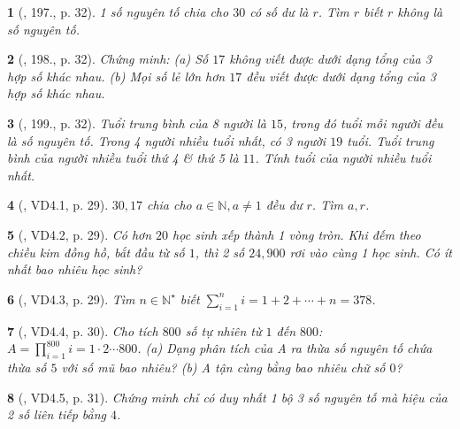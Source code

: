 \documentclass{article}
\newtheorem{baitoan}{}
\begin{document}
\begin{baitoan}[\cite{Binh_Toan_6_tap_1}, 197., p. 32]
	1 số nguyên tố chia cho $30$ có số dư là $r$. Tìm $r$ biết $r$ không là số nguyên tố.
\end{baitoan}

\begin{baitoan}[\cite{Binh_Toan_6_tap_1}, 198., p. 32]
	Chứng minh: (a) Số $17$ không viết được dưới dạng tổng của 3 hợp số khác nhau. (b) Mọi số lẻ lớn hơn $17$ đều viết được dưới dạng tổng của 3 hợp số khác nhau.
\end{baitoan}

\begin{baitoan}[\cite{Binh_Toan_6_tap_1}, 199., p. 32]
	Tuổi trung bình của 8 người là $15$, trong đó tuổi mỗi người đều là số nguyên tố. Trong 4 người nhiều tuổi nhất, có 3 người $19$ tuổi. Tuổi trung bình của người nhiều tuổi thứ 4 \& thứ 5 là $11$. Tính tuổi của người nhiều tuổi nhất.
\end{baitoan}

\begin{baitoan}[\cite{TLCT_THCS_Toan_6_so_hoc}, VD4.1, p. 29]
	$30,17$ chia cho $a\in\mathbb{N},a\ne1$ đều dư $r$. Tìm $a,r$.
\end{baitoan}

\begin{baitoan}[\cite{TLCT_THCS_Toan_6_so_hoc}, VD4.2, p. 29]
	Có hơn $20$ học sinh xếp thành 1 vòng tròn. Khi đếm theo chiều kim đồng hồ, bắt đầu từ số $1$, thì 2 số $24,900$ rơi vào cùng 1 học sinh. Có ít nhất bao nhiêu học sinh?
\end{baitoan}

\begin{baitoan}[\cite{TLCT_THCS_Toan_6_so_hoc}, VD4.3, p. 29]
	Tìm $n\in\mathbb{N}^\star$ biết $\sum_{i=1}^n i = 1 + 2 + \cdots + n = 378$.
\end{baitoan}

\begin{baitoan}[\cite{TLCT_THCS_Toan_6_so_hoc}, VD4.4, p. 30]
	Cho tích $800$ số tự nhiên từ $1$ đến $800$: $A = \prod_{i=1}^{800} i = 1\cdot2\cdots800$. (a) Dạng phân tích của A ra thừa số nguyên tố chứa thừa số $5$ với số mũ bao nhiêu? (b) A tận cùng bằng bao nhiêu chữ số $0$?
\end{baitoan}

\begin{baitoan}[\cite{TLCT_THCS_Toan_6_so_hoc}, VD4.5, p. 31]
	Chứng minh chỉ có duy nhất 1 bộ 3 số nguyên tố mà hiệu của 2 số liên tiếp bằng $4$.
\end{baitoan}
\end{document}
